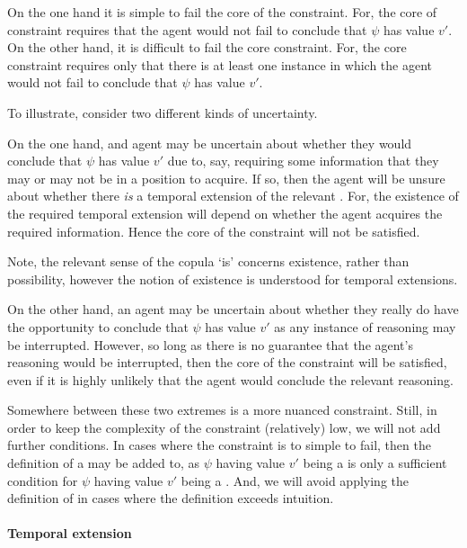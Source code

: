 \begin{note}[Delicacy]
  On the one hand it is simple to fail the core of the constraint.
  For, the core of constraint requires that the agent would not fail to conclude that \(\psi\) has value \(v'\).
  On the other hand, it is difficult to fail the core constraint.
  For, the core constraint requires only that there is at least one instance in which the agent would not fail to conclude that \(\psi\) has value \(v'\).

  To illustrate, consider two different kinds of uncertainty.

  On the one hand, and agent may be uncertain about whether they would conclude that \(\psi\) has value \(v'\) due to, say, requiring some information that they may or may not be in a position to acquire.
  If so, then the agent will be unsure about whether there \emph{is} a temporal extension of the relevant \world{}.
  For, the existence of the required temporal extension will depend on whether the agent acquires the required information.
  Hence the core of the constraint will not be satisfied.

  Note, the relevant sense of the copula `is' concerns existence, rather than possibility, however the notion of existence is understood for temporal extensions.

  On the other hand, an agent may be uncertain about whether they really do have the opportunity to conclude that \(\psi\) has value \(v'\) as any instance of reasoning may be interrupted.
  However, so long as there is no guarantee that the agent's reasoning would be interrupted, then the core of the constraint will be satisfied, even if it is highly unlikely that the agent would conclude the relevant reasoning.

  Somewhere between these two extremes is a more nuanced constraint.
  Still, in order to keep the complexity of the constraint (relatively) low, we will not add further conditions.
  In cases where the constraint is to simple to fail, then the definition of a \requ{} may be added to, as \(\psi\) having value \(v'\) being a \prequ{} is only a sufficient condition for \(\psi\) having value \(v'\) being a \requ{}.
  And, we will avoid applying the definition of \prequ{} in cases where the definition exceeds intuition.
\end{note}

\paragraph{Temporal extension}

